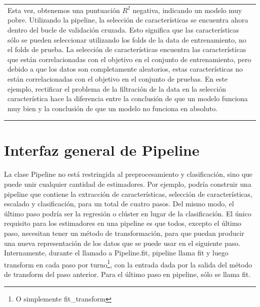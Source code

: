 \begin{longtable}{|p{13.25cm}|}
		
		Esta vez, obtenemos una puntuación $R^{2}$  negativa, indicando un modelo muy pobre.
		Utilizando la pipeline, la selección de características se encuentra ahora dentro del bucle 
		de validación cruzada. Esto significa que las características sólo se pueden seleccionar 
		utilizando los folds  de la data de entrenamiento, no el folds de prueba. 
		La selección de características encuentra las características que están correlacionadas
		con el objetivo en el conjunto de entrenamiento, pero debido a que los datos son 
		completamente aleatorios, estas características no están correlacionadas con el objetivo 
		en el conjunto de pruebas. En este ejemplo, rectificar el problema de la filtración de la 
		data en la selección  característica hace la diferencia entre la conclusión de que un modelo
		funciona muy bien y la conclusión de que un modelo no funciona en absoluto. \\
		\\  	
		\arrayrulecolor{red}\hline
		
	\end{longtable}
	

	
	\section{Interfaz general  de  Pipeline}
	
	La clase Pipeline no está restringida al preprocesamiento y clasificación, sino que puede
	unir cualquier cantidad de estimadores. Por ejemplo, podría construir una  pipeline
	que contiene la extracción de características, selección de características, escalado y clasificación, para un total de cuatro pasos. Del mismo modo, el último paso podría ser la regresión o clúster en lugar de la clasificación.  El único requisito para los estimadores en una pipeline es que todos, excepto el último paso, necesitan tener un método de transformación, para que puedan producir una nueva representación de los datos que se puede usar en el siguiente paso.\\
	
	
	Internamente, durante el  llamado a {\ttfamily Pipeline.fit},  pipeline llama {\ttfamily fit }  y luego   {\ttfamily  transform}  en cada paso por turno\footnote{O simplemente {\ttfamily fit\_transform}}, con la entrada dada por la salida del método de {\ttfamily  transform} del paso anterior. 
	Para el último paso en pipeline, sólo se llama {\ttfamily fit}.\\
	
